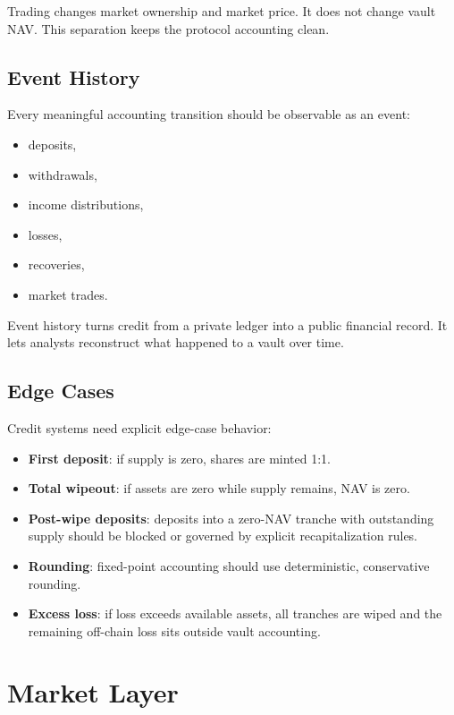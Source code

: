 \documentclass[11pt]{article}
\begin{document}
Trading changes market ownership and market price. It does not change vault NAV.
This separation keeps the protocol accounting clean.

\subsection{Event History}

Every meaningful accounting transition should be observable as an event:

\begin{itemize}
  \item deposits,
  \item withdrawals,
  \item income distributions,
  \item losses,
  \item recoveries,
  \item market trades.
\end{itemize}

Event history turns credit from a private ledger into a public financial record.
It lets analysts reconstruct what happened to a vault over time.

\subsection{Edge Cases}

Credit systems need explicit edge-case behavior:

\begin{itemize}
  \item \textbf{First deposit}: if supply is zero, shares are minted 1:1.
  \item \textbf{Total wipeout}: if assets are zero while supply remains, NAV is
  zero.
  \item \textbf{Post-wipe deposits}: deposits into a zero-NAV tranche with
  outstanding supply should be blocked or governed by explicit recapitalization
  rules.
  \item \textbf{Rounding}: fixed-point accounting should use deterministic,
  conservative rounding.
  \item \textbf{Excess loss}: if loss exceeds available assets, all tranches are
  wiped and the remaining off-chain loss sits outside vault accounting.
\end{itemize}

\section{Market Layer}
\end{document}
